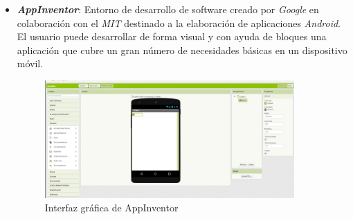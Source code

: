\begin{itemize}
    \item \textit{\textbf{AppInventor}}\cite{bib:appinventor}: Entorno de desarrollo de software creado por \textit{Google} en colaboración con el \textit{MIT} destinado a la elaboración de aplicaciones \textit{Android}. El usuario puede desarrollar de forma visual y con ayuda de bloques una aplicación que cubre un gran número de necesidades básicas en un dispositivo móvil.
        \begin{figure}[h]
        \centering
        \includegraphics[width=0.9\textwidth]{img/AppInventor.png}
        \caption{Interfaz gráfica de AppInventor} \label{fig:appinventor}
    \end{figure}
    
\end{itemize}


